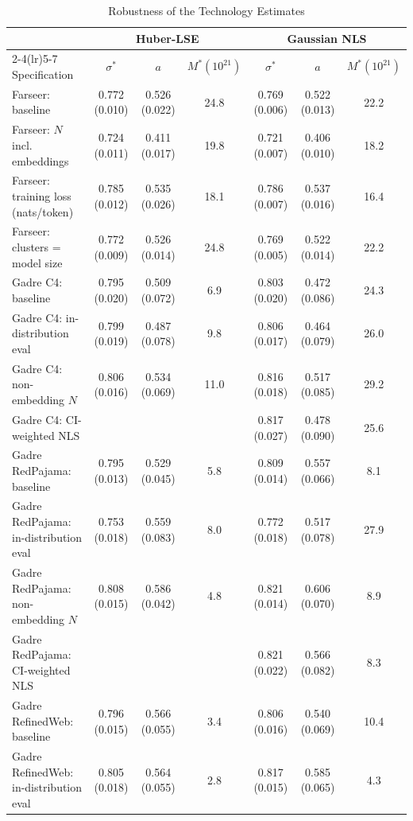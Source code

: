\begin{table}[!htbp]
\centering
\footnotesize
\caption{Robustness of the Technology Estimates}
\label{tab:techrobust}
\begin{threeparttable}
\begin{tabular}{lcccccc}
\toprule
& \multicolumn{3}{c}{Huber-LSE} & \multicolumn{3}{c}{Gaussian NLS} \\
\cmidrule(lr){2-4}\cmidrule(lr){5-7}
Specification & $\sigma^*$ & $a$ & $M^*(10^{21})$ & $\sigma^*$ & $a$ & $M^*(10^{21})$ \\
\midrule
Farseer: baseline & 0.772 (0.010) & 0.526 (0.022) & 24.8 & 0.769 (0.006) & 0.522 (0.013) & 22.2 \\
Farseer: $N$ incl. embeddings & 0.724 (0.011) & 0.411 (0.017) & 19.8 & 0.721 (0.007) & 0.406 (0.010) & 18.2 \\
Farseer: training loss (nats/token) & 0.785 (0.012) & 0.535 (0.026) & 18.1 & 0.786 (0.007) & 0.537 (0.016) & 16.4 \\
Farseer: clusters = model size & 0.772 (0.009) & 0.526 (0.014) & 24.8 & 0.769 (0.005) & 0.522 (0.014) & 22.2 \\
Gadre C4: baseline & 0.795 (0.020) & 0.509 (0.072) & 6.9 & 0.803 (0.020) & 0.472 (0.086) & 24.3 \\
Gadre C4: in-distribution eval & 0.799 (0.019) & 0.487 (0.078) & 9.8 & 0.806 (0.017) & 0.464 (0.079) & 26.0 \\
Gadre C4: non-embedding $N$ & 0.806 (0.016) & 0.534 (0.069) & 11.0 & 0.816 (0.018) & 0.517 (0.085) & 29.2 \\
Gadre C4: CI-weighted NLS &  &  &  & 0.817 (0.027) & 0.478 (0.090) & 25.6 \\
Gadre RedPajama: baseline & 0.795 (0.013) & 0.529 (0.045) & 5.8 & 0.809 (0.014) & 0.557 (0.066) & 8.1 \\
Gadre RedPajama: in-distribution eval & 0.753 (0.018) & 0.559 (0.083) & 8.0 & 0.772 (0.018) & 0.517 (0.078) & 27.9 \\
Gadre RedPajama: non-embedding $N$ & 0.808 (0.015) & 0.586 (0.042) & 4.8 & 0.821 (0.014) & 0.606 (0.070) & 8.9 \\
Gadre RedPajama: CI-weighted NLS &  &  &  & 0.821 (0.022) & 0.566 (0.082) & 8.3 \\
Gadre RefinedWeb: baseline & 0.796 (0.015) & 0.566 (0.055) & 3.4 & 0.806 (0.016) & 0.540 (0.069) & 10.4 \\
Gadre RefinedWeb: in-distribution eval & 0.805 (0.018) & 0.564 (0.055) & 2.8 & 0.817 (0.015) & 0.585 (0.065) & 4.3 \\

\end{tabular}
\end{threeparttable}
\end{table}
